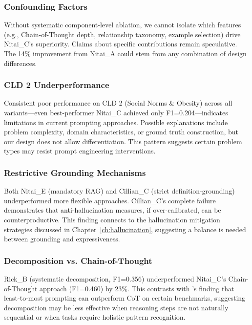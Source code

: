 \subsubsection{Confounding Factors}

Without systematic component-level ablation, we cannot isolate which features (e.g., Chain-of-Thought depth, relationship taxonomy, example selection) drive Nitai\_C's superiority. Claims about specific contributions remain speculative. The 14\% improvement from Nitai\_A could stem from any combination of design differences.

\subsubsection{CLD 2 Underperformance}

Consistent poor performance on CLD 2 (Social Norms \& Obesity) across all variants—even best-performer Nitai\_C achieved only F1=0.204—indicates limitations in current prompting approaches. Possible explanations include problem complexity, domain characteristics, or ground truth construction, but our design does not allow differentiation. This pattern suggests certain problem types may resist prompt engineering interventions.

\subsubsection{Restrictive Grounding Mechanisms}

Both Nitai\_E (mandatory RAG) and Cillian\_C (strict definition-grounding) underperformed more flexible approaches. Cillian\_C's complete failure demonstrates that anti-hallucination measures, if over-calibrated, can be counterproductive. This finding connects to the hallucination mitigation strategies discussed in Chapter~\ref{ch:hallucination}, suggesting a balance is needed between grounding and expressiveness.

\subsubsection{Decomposition vs. Chain-of-Thought}

Rick\_B (systematic decomposition, F1=0.356) underperformed Nitai\_C's Chain-of-Thought approach (F1=0.460) by 23\%. This contrasts with \cite{zhou2022least}'s finding that least-to-most prompting can outperform CoT on certain benchmarks, suggesting decomposition may be less effective when reasoning steps are not naturally sequential or when tasks require holistic pattern recognition.

